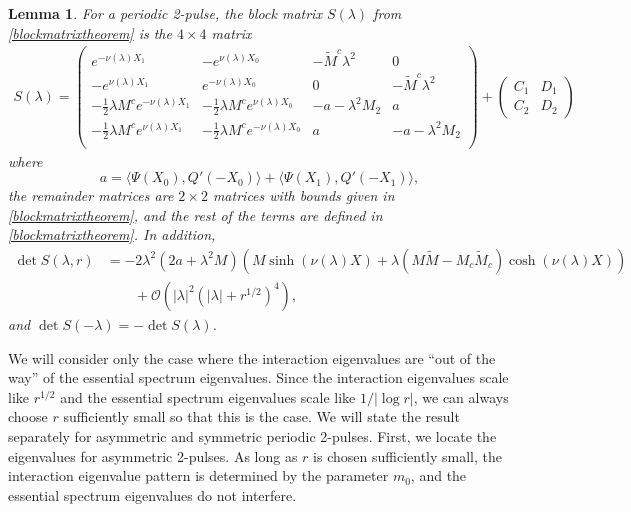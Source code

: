 \documentclass[11pt,reqno]{amsart}
\theoremstyle{plain}
\newtheorem{lemma}[theorem]{Lemma}
\theoremstyle{definition}
\theoremstyle{remark}
\begin{document}
\begin{lemma}\label{lemmma:2pblockmatrix}
For a periodic 2-pulse, the block matrix $S(\lambda)$ from \cref{blockmatrixtheorem} is the $4 \times 4$ matrix
\begin{align}\label{dpSmatrix}
S(\lambda) = 
\begin{pmatrix}
e^{-\nu(\lambda)X_1} & -e^{\nu(\lambda)X_0} & -\tilde{M}^c \lambda^2 & 0 \\
-e^{\nu(\lambda)X_1} & e^{-\nu(\lambda)X_0} & 0 & -\tilde{M}^c \lambda^2 \\
-\frac{1}{2}\lambda M^c e^{-\nu(\lambda)X_1} & -\frac{1}{2}\lambda M^ce^{\nu(\lambda)X_0} &-a-\lambda^2 M_2 & a \\
-\frac{1}{2}\lambda M^c e^{\nu(\lambda)X_1} & -\frac{1}{2}\lambda M^c e^{-\nu(\lambda)X_0}  & a & -a-\lambda^2 M_2 \\
\end{pmatrix}
+ \begin{pmatrix} C_1 & D_1 \\ C_2 & D_2 \end{pmatrix}
\end{align}
where
\begin{equation}\label{2pa}
a = \langle \Psi(X_0), Q'(-X_0) \rangle + \langle \Psi(X_1), Q'(-X_1) \rangle,
\end{equation}
the remainder matrices are $2\times2$ matrices with bounds given in \cref{blockmatrixtheorem}, and the rest of the terms are defined in \cref{blockmatrixtheorem}. In addition,
\begin{equation}\label{2pblockmatrixdet}
\begin{aligned}
\det S(\lambda, r) &= -2 \lambda^2 (2a + \lambda^2 M)\left( M \sinh(\nu(\lambda)X) + \lambda(M \tilde{M} - M_c \tilde{M}_c)\cosh(\nu(\lambda)X) \right) \\
&\qquad+ \mathcal{O}\left(|\lambda|^2(|\lambda| + r^{1/2})^4\right),
\end{aligned}
\end{equation}
and $\det S(-\lambda) = -\det S(\lambda)$.
\end{lemma}

We will consider only the case where the interaction eigenvalues are ``out of the way'' of the essential spectrum eigenvalues. Since the interaction eigenvalues scale like $r^{1/2}$ and the essential spectrum eigenvalues scale like $1/|\log r|$, we can always choose $r$ sufficiently small so that this is the case. We will state the result separately for asymmetric and symmetric periodic 2-pulses. First, we locate the eigenvalues for asymmetric 2-pulses. As long as $r$ is chosen sufficiently small, the interaction eigenvalue pattern is determined by the parameter $m_0$, and the essential spectrum eigenvalues do not interfere.
\end{document}
